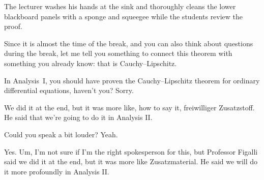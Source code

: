 \begin{note}
The lecturer washes his hands at the sink and thoroughly cleans the lower blackboard panels with a sponge and squeegee while the students review the proof.
\end{note}

\begin{speech}[00:40:57 - 00:41:52]
Since it is almost the time of the break, and you can also think about questions during the break, let me tell you something to connect this theorem with something you already know: that is Cauchy--Lipschitz.

In Analysis~I, you should have proven the Cauchy--Lipschitz theorem for ordinary differential equations, haven't you?  Sorry.
\end{speech}

\begin{student}
We did it at the end, but it was more like, how to say it, freiwilliger Zusatzstoff. He said that we're going to do it in Analysis II.
\end{student}

\begin{speech}[00:42:01 - 00:42:03]
Could you speak a bit louder? Yeah.
\end{speech}

\begin{student}
Yes. Um, I'm not sure if I'm the right spokesperson for this, but Professor Figalli said we did it at the end, but it was more like Zusatzmaterial. He said we will do it more profoundly in Analysis II.
\end{student}

